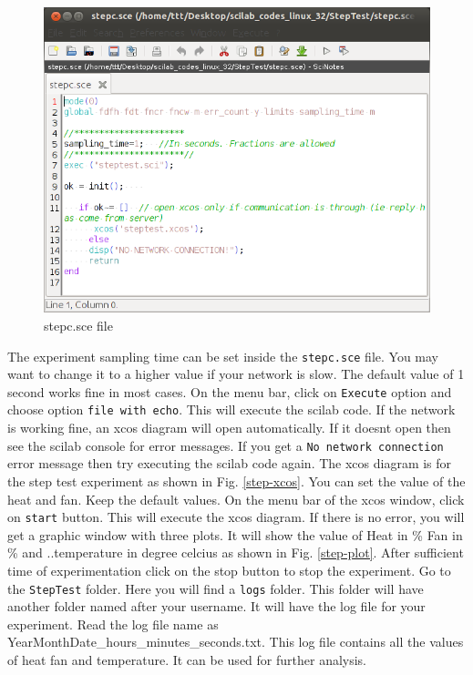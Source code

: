 \begin{figure}
\centering
\includegraphics[width=0.7\linewidth]{vlabs/stepc.png}
\caption{stepc.sce file}
\label{stepc}
\end{figure}

The experiment sampling time can be set inside the  {\tt stepc.sce} file. You may want to change it to a higher value if your network is slow. The default value of 1 second works fine in most cases. On the menu bar, click on {\tt Execute} option and choose option {\tt file with echo}. This will execute  the scilab code. If the network is working fine, an xcos diagram will open automatically. If it doesnt open then see the scilab console for error messages. If you get a {\tt No network connection} error message then try executing the scilab code again. The xcos diagram is for the step test experiment as shown in Fig. \ref{step-xcos}. You can set the value of the heat and fan. Keep the default values. On the menu bar of the xcos window, click on {\tt start} button. This will execute the xcos diagram. If there is no error, you will get a graphic window with three plots. It will show the value of Heat in \% Fan in \% and ..temperature in degree celcius as shown in Fig. \ref{step-plot}. After sufficient time of experimentation click on the stop button to stop the experiment. Go to the {\tt StepTest} folder. Here you will find a {\tt logs} folder. This folder will have another folder named after your username. It will have the log file for your experiment. Read the log file name as\\ YearMonthDate\_hours\_minutes\_seconds.txt. This log file contains all the values of heat fan and temperature. It can be used for further analysis.

